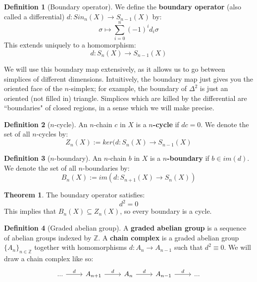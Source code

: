 \documentclass[11pt, oneside]{amsart}   	%
\theoremstyle{definition}
\newtheorem{definition}{Definition}[section]
\newtheorem{theorem}{Theorem}[section]
\begin{document}
\begin{definition}[Boundary operator]
	We define the \textbf{boundary operator} (also called a differential) $d : Sin_n(X)\rightarrow 
	S_{n - 1}(X)$ by:
	\begin{equation}
		\sigma\mapsto\sum_{i = 0}^n (-1)^i d_i\sigma
	\end{equation}
	This extends uniquely to a homomorphism:
	\begin{equation}
		d : S_n(X)\rightarrow S_{n - 1}(X)
	\end{equation}
\end{definition}

We will use this boundary map extensively, as it allows us to go between simplices of different dimensions. 
Intuitively, the boundary map just gives you the oriented face of the $n$-simplex; for example, the 
boundary of $\Delta^2$ is just an oriented (not filled in) triangle. Simplices which are killed by the 
differential are ``boundaries" of closed regions, in a sense which we will make precise.

\begin{definition}[$n$-cycle]
	An $n$-chain $c$ in $X$ is a \textbf{$n$-cycle} if $dc = 0$. We denote the set of all $n$-cycles by:
	\begin{equation}
		Z_n(X) := ker(d : S_n(X)\rightarrow S_{n - 1}(X)
	\end{equation}
\end{definition}

\begin{definition}[$n$-boundary]
	An $n$-chain $b$ in $X$ is a \textbf{$n$-boundary} if $b\in im(d)$. We denote the set of all 
	$n$-boundaries by:
	\begin{equation}
		B_n(X) := im(d : S_{n + 1}(X)\rightarrow S_n(X))
	\end{equation}
\end{definition}

\begin{theorem}
	The boundary operator satisfies:
	\begin{equation}
		d^2 = 0
	\end{equation}
	This implies that $B_n(X)\subseteq Z_n(X)$, so every boundary is a cycle. 
\end{theorem}

\begin{definition}[Graded abelian group]
	A \textbf{graded abelian group} is a sequence of abelian groups indexed by $\mathbb Z$. A 
	\textbf{chain complex} is a graded abelian group $\{A_n\}_{n\in\mathbb Z}$ together with 
	homomorphisms $d : A_n\rightarrow A_{n - 1}$ such that $d^2\equiv 0$. We will draw a chain 
	complex like so:
	\[
		\vspace{-.7cm}
		\begin{tikzcd}
			...\arrow[r, "d"] & A_{n + 1}\arrow[r, "d"] & A_n\arrow[r, "d"] & A_{n - 1}\arrow[r, "d"] & ... \\
		\end{tikzcd}
	\]
\end{definition}
\end{document}
